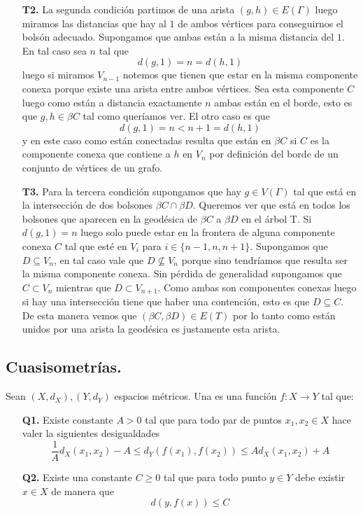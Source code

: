 \documentclass[tesis.tex]{subfiles}
\begin{document}
\begin{ej}
\begin{enumerate}
		\item[\textbf{T2.}] La segunda condición partimos de una arista $(g,h) \in E(\Gamma)$ luego miramos las distancias que hay al $1$ de ambos vértices para conseguirnos el bolsón adecuado. 
		Supongamos que ambas están a la misma distancia del $1$. En tal caso sea $n$ tal que 
		\[
			d(g,1)=n = d(h,1)
		\] 
		luego si miramos $V_{n-1}$ notemos que tienen que estar en la misma componente conexa porque existe una arista entre ambos vértices. Sea esta componente $C$ luego como están a distancia exactamente $n$ ambas están en el borde, esto es que $g,h \in \beta C$ tal como queríamos ver. 
		El otro caso es que 
		\[
			d(g,1)=n < n+1 = d(h,1)
		\] 
		y en este caso como están conectadas resulta que están en $\beta C$ si $C$ es la componente conexa que contiene a $h$ en $V_n$ por definición del borde de un conjunto de vértices de un grafo.
		
		\item[\textbf{T3.}] Para la tercera condición supongamos que hay $g \in V(\Gamma)$ tal que está en la intersección de dos bolsones $\beta C \cap \beta D$. 
		Queremos ver que está en todos los bolsones que aparecen en la geodésica de $\beta C$ a $\beta D$ en el árbol T. 
		Si $d(g,1) = n$ luego solo puede estar en la frontera de alguna componente conexa $C$ tal que esté en $V_{i}$ para $i\in \{n-1, n, n+1\}$. 
		Supongamos que $D \subseteq V_{n}$, en tal caso vale que $D \nsubseteq V_{n}$ porque sino tendríamos que resulta ser la misma componente conexa. 
		Sin pérdida de generalidad supongamos que $C \subset V_n$ mientras que $D \subset V_{n+1}$. 
		Como ambas son componentes conexas luego si hay una intersección tiene que haber una contención, esto es que $D \subseteq C$. 
		De esta manera vemos que $(\beta C, \beta D) \in E(T)$ por lo tanto como están unidos por una arista la geodésica es justamente esta arista.
		
	\end{enumerate}
\end{ej}



\subsection{Cuasisometrías.}


\begin{deff}
	Sean $(X,d_X),(Y,d_Y)$ espacios métricos. 
	Una  es una función $f:X \to Y$ tal que:
	\begin{itemize}
		\item[\textbf{Q1.}] Existe constante $A > 0$ tal que para todo par de puntos $x_1,x_2 \in X$ hace valer la siguientes desigualdades
		\[
		\frac{1}{A} d_X(x_1,x_2) - A \le d_Y(f(x_1),f(x_2)) \le A d_X(x_1,x_2) + A
		\]
		\item[\textbf{Q2.}] Existe una constante $C \ge 0$ tal que para todo punto $y \in Y$ debe existir $x \in X$ de manera que 
		\[
		d(y,f(x)) \le C
		\]
	\end{itemize}
\end{deff}
\end{document}
